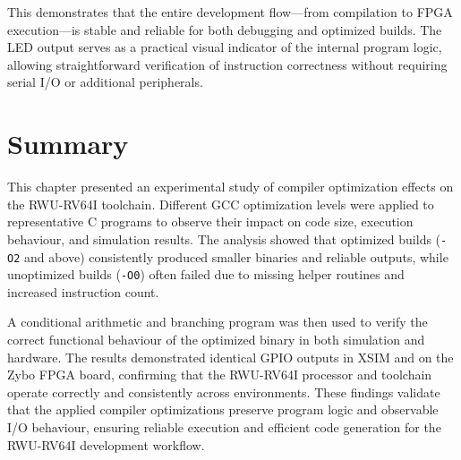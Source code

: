 This demonstrates that the entire development flow—from compilation to FPGA execution—is stable and reliable for both debugging and optimized builds.  
The LED output serves as a practical visual indicator of the internal program logic, allowing straightforward verification of instruction correctness without requiring serial I/O or additional peripherals.

\section{Summary}
This chapter presented an experimental study of compiler optimization effects on the RWU-RV64I toolchain.  
Different GCC optimization levels were applied to representative C programs to observe their impact on code size, execution behaviour, and simulation results.  
The analysis showed that optimized builds (\texttt{-O2} and above) consistently produced smaller binaries and reliable outputs, while unoptimized builds (\texttt{-O0}) often failed due to missing helper routines and increased instruction count.

A conditional arithmetic and branching program was then used to verify the correct functional behaviour of the optimized binary in both simulation and hardware.  
The results demonstrated identical GPIO outputs in XSIM and on the Zybo FPGA board, confirming that the RWU-RV64I processor and toolchain operate correctly and consistently across environments.  
These findings validate that the applied compiler optimizations preserve program logic and observable I/O behaviour, ensuring reliable execution and efficient code generation for the RWU-RV64I development workflow.

